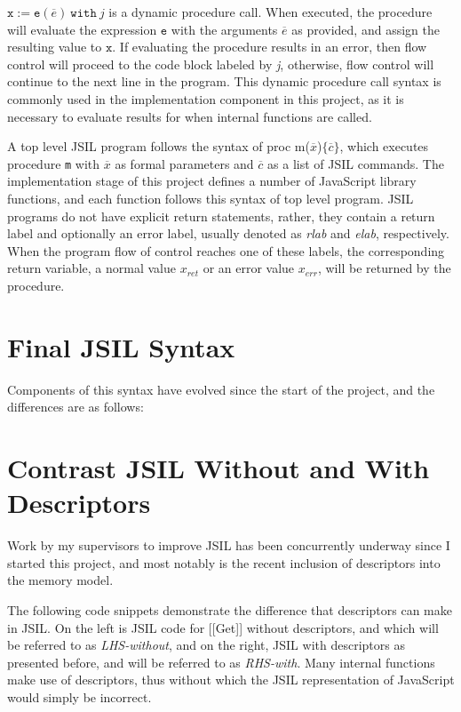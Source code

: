 \documentclass[a4paper,11pt,twoside]{report}
\begin{document}
$\mathtt{x} := \mathtt{e}(\overline{e})\ \mathtt{with}\ \textit{j}$ is a dynamic procedure call. When executed, the procedure will evaluate the expression $\mathtt{e}$ with the arguments $\overline{e}$ as provided, and assign the resulting value to $\mathtt{x}$. If evaluating the procedure results in an error, then flow control will proceed to the code block labeled by \textit{j}, otherwise, flow control will continue to the next line in the program. This dynamic procedure call syntax is commonly used in the implementation component in this project, as it is necessary to evaluate results for when internal functions are called.

A top level JSIL program follows the syntax of proc m($\overline{x}$)$\{\overline{c}\}$, which executes procedure \texttt{m} with $\overline{x}$ as formal parameters and $\overline{c}$ as a list of JSIL commands. The implementation stage of this project defines a number of JavaScript library functions, and each function follows this syntax of top level program. JSIL programs do not have explicit return statements, rather, they contain a return label and optionally an error label, usually denoted as \textit{rlab} and \textit{elab}, respectively. When the program flow of control reaches one of these labels, the corresponding return variable, a normal value $x_{ret}$ or an error value $x_{err}$, will be returned by the procedure.

\section{Final JSIL Syntax}
Components of this syntax have evolved since the start of the project, and the differences are as follows:

\section{Contrast JSIL Without and With Descriptors}
Work by my supervisors to improve JSIL has been concurrently underway since I started this project, and most notably is the recent inclusion of descriptors into the memory model.

The following code snippets demonstrate the difference that descriptors can make in JSIL. On the left is JSIL code for [[Get]] without descriptors, and which will be referred to as \textit{LHS-without}, and on the right, JSIL with descriptors as presented before, and will be referred to as \textit{RHS-with}. Many internal functions make use of descriptors, thus without which the JSIL representation of JavaScript would simply be incorrect.
\end{document}
